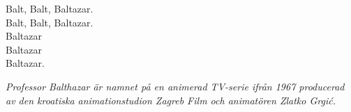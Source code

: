 \vspace{10pt}
Balt, Balt, Baltazar.\\
Balt, Balt, Baltazar.\\
Baltazar\\
Baltazar\\
Baltazar.
\par
\vspace{10pt}
{\footnotesize\textit{Professor Balthazar är namnet på en animerad TV-serie ifrån 1967 producerad av den kroatiska animationstudion Zagreb Film och animatören Zlatko Grgić.}}
